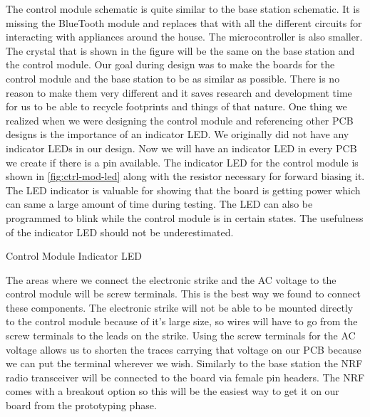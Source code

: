 The control module schematic is quite similar to the base
station schematic. It is missing the BlueTooth module and replaces that with
all the different circuits for interacting with appliances around the house.
The microcontroller is also smaller. The crystal that is shown in the figure
will be the same on the base station and the control module. Our goal during
design was to make the boards for the control module and the base station to
be as similar as possible.  There is no reason to make them very different
and it saves research and development time for us to be able to recycle
footprints and things of that nature. One thing we realized when we were
designing the control module and referencing other PCB designs is the
importance of an indicator LED. We originally did not have any indicator LEDs
in our design.  Now we will have an indicator LED in every PCB we create if
there is a pin available. The indicator LED for the control module is shown
in \autoref{fig:ctrl-mod-led} along with the resistor necessary for forward biasing
it. The LED indicator is valuable for showing that the board is getting power
which can same a large amount of time during testing. The LED can also be
programmed to blink while the control module is in certain states. The
usefulness of the indicator LED should not be underestimated.

{Control Module Indicator LED}

The areas where we connect the electronic strike and the AC
voltage to the control module will be screw terminals. This is the best way
we found to connect these components. The electronic strike will not be able
to be mounted directly to the control module because of it{}'s large size, so
wires will have to go from the screw terminals to the leads on the strike.
Using the screw terminals for the AC voltage allows us to shorten the traces
carrying that voltage on our PCB because we can put the terminal wherever we
wish. Similarly to the base station the NRF radio transceiver will be
connected to the board via female pin headers. The NRF comes with a breakout
option so this will be the easiest way to get it on our board from the
prototyping phase.
